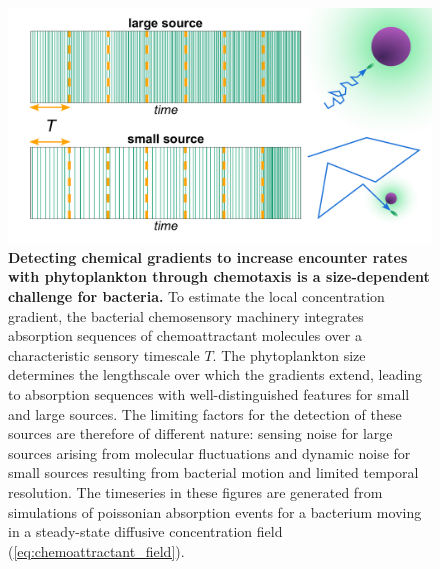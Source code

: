 \documentclass[9pt,twocolumn,twoside]{pnas-new}
\begin{document}
\begin{figure}
    \centering
    \includegraphics[width=11.4cm]{fig1_new.pdf}
    \caption{
        \textbf{
        Detecting chemical gradients to increase encounter rates with phytoplankton through chemotaxis is a size-dependent challenge for bacteria.
        }
        To estimate the local concentration gradient, the bacterial chemosensory machinery integrates absorption sequences of chemoattractant molecules over a characteristic sensory timescale $T$.
        The phytoplankton size determines the lengthscale over which the gradients extend, leading to absorption sequences with well-distinguished features for small and large sources.
        The limiting factors for the detection of these sources are therefore of different nature: sensing noise for large sources arising from molecular fluctuations and dynamic noise for small sources resulting from bacterial motion and limited temporal resolution.
        The timeseries in these figures are generated from simulations of poissonian absorption events for a bacterium moving in a steady-state diffusive concentration field (\autoref{eq:chemoattractant_field}).
    }
    \label{fig:setup}
\end{figure}
\end{document}
